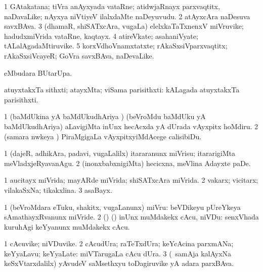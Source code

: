 \bentry
{}
\gl{\nA}
\bmng
\bnum
\num{1} GAtakatana; tiVra anAyxyada vataRne; atidwjaRnayx parxvaqtitx, naDavaLike; nAyxya niVtiyeV ilalxdaMte naDeyuvudu. 
\num{2} atAyxcAra naDesuva savxBAva. 
\num{3} (dhamaR, shiSATxcAra, \mo vugaLa) elelxkaTaTxnenxV miVruvike; hadudxmiVrida vataRne, kaqtayx. 
\num{4} atireVkate; asahaniVyate; tALalAgadaMtiruvike. 
\num{5} korxVdhoVnamxtatxte; rAkaSxsiVparxvaqtitx; rAkaSxsiVcayeR; GoVra savxBAva, naDevaLike. 
\enum
\emng
\eentry

\bentry
{}
\gl{\kirx}
\bmng
{} eMbudara BUtarUpa. 
\emng
\eentry

\bentry
{}
\gl{\nA}
\bmng
atuyxtakxTa sithxti; atayxMta; viSama parisithxti:  kALagada atuyxtakxTa parisithxti. 
\emng
\eentry

\bentry
{}
\gl{\sakirx}
\bmng
\bnum
\num{1} (baMdUkina yA baMdUkudhAriya \vi) (beVroMdu baMdUku yA baMdUkudhAriya) aLavigiMta inUnx hecAcxda yA dUrada vAyxpitx hoMdiru. 
\num{2} (samara nwkeya \vi) PiraMgigaLa vAyxpitxyiMdAcege calisibiDu. 
\enum
\emng
\eentry

\bentry
{}
\gl{\sakirx}
\bmng
\bnum
\num{1} (dajeR, adhikAra, padavi, \mo vugaLalilx) itararanunx miVrisu; itararigiMta meVladxjeRyavanAgu. 
\num{2} (inonxbabxnigiMta) hecicxna, meVlina Adayxte paDe. 
\enum
\emng
\eentry

\bentry
{}
\gl{\gu}
\expl{\F}
\bmng
\bnum
\num{1} aucitayx miVrida; mayARde miVrida; shiSATxcAra miVrida. 
\num{2} vakarx; vicitarx; vilakaSxNa; tikakxlina. 
\num{3} asaBayx. 
\enum
\emng
\eentry

\bentry
{}
\gl{\sakirx}
\bmng
\bnum
\num{1} (beVroMdara eTuku, shakitx, \mo vugaLanunx) miVru:  beVDikeyu pUreYkeya sAmathayxRvanunx miVride. 
\num{2} (\kAparx) (\pArxparx) inUnx muMdakekx cAcu, niVDu:  senxVhada kuruhAgi keYyanunx muMdakekx cAcu. 
\enum
\emng
\eentry

\bentry
{}
\gl{\nA}
\bmng
\bnum
\num{1} cAcuvike; niVDuvike. 
\num{2} cAcudUra; raTeTxdUra; keYcAcina parxmANa; keYyaLavu; keYyaLate:  miVTarugaLa cAcu dUra. 
\num{3} (\kanmu\ samAja kalAyxNa keSxVtarxdalilx) yAvudeV saMsethxyu toDagiruvike yA adara parxBAva. 
\enum
\emng
\eentry

